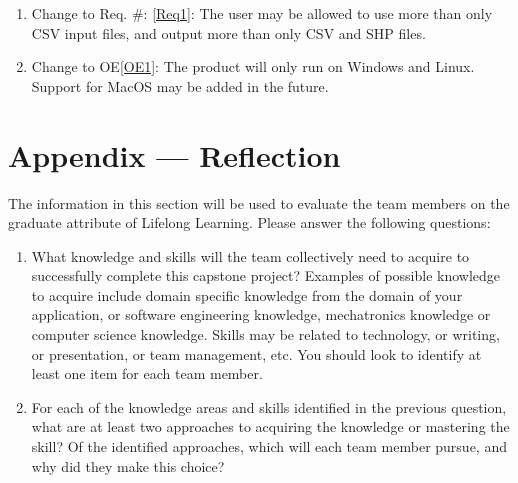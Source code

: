 \documentclass[12pt, titlepage]{article}
\newcommand{\reqref}[1]{Req. \#: \ref{#1}}
\begin{document}
\begin{enumerate}[{LC}1. ]
    \item Change to \reqref{Req1}: The user may be allowed to use more than only CSV input files, and output more than only CSV and SHP files.
    \item Change to OE\ref{OE1}: The product will only run on Windows and Linux. Support for MacOS may be added in the future.
\end{enumerate}

\section*{Appendix --- Reflection}
The information in this section will be used to evaluate the team members on the
graduate attribute of Lifelong Learning.  Please answer the following questions:

\begin{enumerate}
  \item What knowledge and skills will the team collectively need to acquire to
  successfully complete this capstone project?  Examples of possible knowledge
  to acquire include domain specific knowledge from the domain of your
  application, or software engineering knowledge, mechatronics knowledge or
  computer science knowledge.  Skills may be related to technology, or writing,
  or presentation, or team management, etc.  You should look to identify at
  least one item for each team member.
  \item For each of the knowledge areas and skills identified in the previous
  question, what are at least two approaches to acquiring the knowledge or
  mastering the skill?  Of the identified approaches, which will each team
  member pursue, and why did they make this choice?
\end{enumerate}
\end{document}

